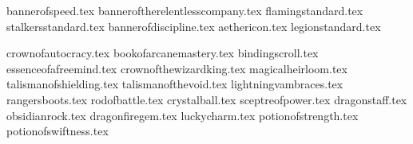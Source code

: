 \begin{multicols*}{2}
\endsortedpricelistNSP

\ifdef{\languageisfrench}{}{\columnbreak}

\hypertarget{banner_enchantments}{\basicsubsubtitle{\bannerenchantments}}
\label{banner_enchantments}

\startsortedpricelistNSP

{bannerofspeed.tex}
{banneroftherelentlesscompany.tex}
{flamingstandard.tex}
{stalkersstandard.tex}
{bannerofdiscipline.tex}
{aethericon.tex}
{legionstandard.tex}

\endsortedpricelistNSP
\newpage
\ifdef{\languageisfrench}{}{\columnbreak}

\hypertarget{artefacts}{\basicsubsubtitle{\artefacts}}
\label{artefacts}

\startsortedpricelistNSP

{crownofautocracy.tex}
{bookofarcanemastery.tex}
{bindingscroll.tex}
{essenceofafreemind.tex}
{crownofthewizardking.tex}
{magicalheirloom.tex}
{talismanofshielding.tex}
{talismanofthevoid.tex}
{lightningvambraces.tex}
{rangersboots.tex}
{rodofbattle.tex}
{crystalball.tex}
{sceptreofpower.tex}
{dragonstaff.tex}
{obsidianrock.tex}
{dragonfiregem.tex}
{luckycharm.tex}
{potionofstrength.tex}
{potionofswiftness.tex}

\endsortedpricelistNSP
\end{multicols*}
